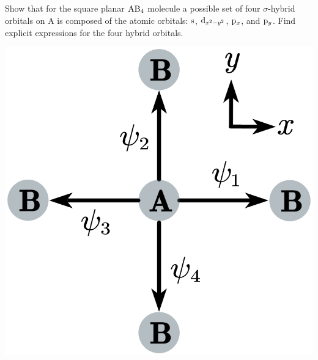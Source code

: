 \documentclass[a4paper]{book}
\newcommand{\orb}[1]{{\rm #1}}
\newcommand{\orbs}{\orb{s}}
\newcommand{\orbp}{\orb{p}}
\newcommand{\orbd}{\orb{d}}
\begin{document}
	\begin{exercise}
		Show that for the square planar $\ce{AB4}$ molecule a possible set of four $\sigma$-hybrid orbitals on A is composed of the atomic orbitals: $\orbs$, $\orbd_{x^2-y^2}$, $\orbp_x$, and $\orbp_y$. Find explicit expressions for the four hybrid orbitals.
	\end{exercise}
	
	\begin{solution}
		
		
				\begin{minipage}[t]{1.0\linewidth}
		\begin{center}
		\setlength{\abovecaptionskip}{0.5em}
		\includegraphics[scale=1.5]{./structures/exercise_4/square_planar.png}
		\end{center}
		\end{minipage}	
		
	\end{solution}
\end{document}
